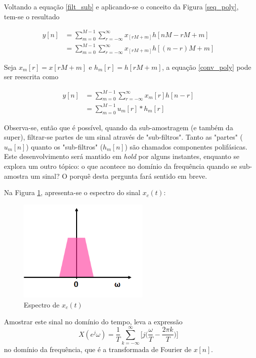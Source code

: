 Voltando a equação \ref{filt_sub} e aplicando-se o conceito da Figura \ref{seq_poly}, tem-se o resultado

\begin{equation} \label{conv_poly}
\begin{split}
y[n] &= \sum_{m=0}^{M-1}\sum_{r=-\infty}^{\infty}x_[rM+m]h[nM-rM+m] \\ 
     &= \sum_{m=0}^{M-1}\sum_{r=-\infty}^{\infty}x_[rM+m]h[(n-r)M+m] 
\end{split}
\end{equation}

Seja $x_m[r] = x[rM + m ]$ e $h_m[r] = h[rM + m]$, a equação \ref{conv_poly} pode ser reescrita como \cite{Kirshna}

\begin{equation} \label{conv_poly2}
\begin{split}
y[n] &= \sum_{m=0}^{M-1}\sum_{r=-\infty}^{\infty}x_{m}[r]h[n-r] \\ 
     &= \sum_{m=0}^{M-1}u_{m}[r]\ast h_{m}[r]
\end{split}
\end{equation}

Observa-se, então que é possível, quando da sub-amostragem (e também da super), filtrar-se partes de um sinal através de "sub-filtros". Tanto as "partes" ($u_{m}[n]$) quanto os "sub-filtros" ($h_{m}[n]$) são chamados componentes polifásicas. Este desenvolvimento será mantido em \textit{hold} por alguns instantes, enquanto se explora um outro tópico: o que acontece no domínio da frequência quando se sub-amostra um sinal? O porquê desta pergunta fará sentido em breve. 

Na Figura \ref{x_freq}, apresenta-se o espectro do sinal $x_{c}(t)$: 

\begin{figure}[h!]
\centering
\includegraphics[width=2.5in]{spec_x.png} %
\caption{Espectro de $x_c(t)$}
\label{x_freq}
\end{figure}
Amostrar este sinal no domínio do tempo, leva a expressão \cite{Krishna}
\begin{equation}
X(e^j\omega) = \frac{1}{T}\sum_{k=-\infty}^{\infty}\bigg[j\bigg(\frac{\omega}{T}-\frac{2\pi k}{T}\bigg)\bigg]
\end{equation}
no domínio da frequência, que é a transformada de Fourier de $x[n]$. 

